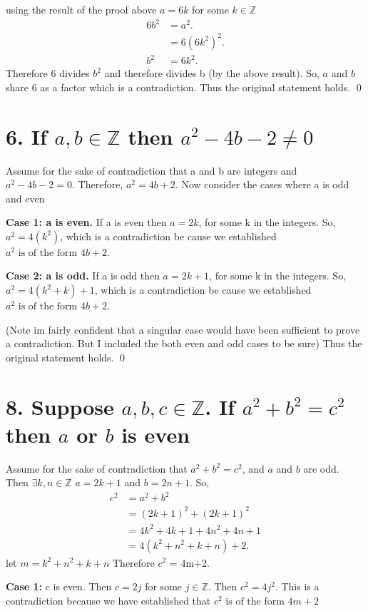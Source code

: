 \documentclass{article}
\newcommand{\ints}{\mathbb{Z}}
\newcommand{\st}{\text{ such that }}
\begin{document}
	using the result of the proof above $a = 6k$ for some $k \in \ints$
	\begin{align*}
		6b^2 &= a^2. \\
		&= 6(6k^2)^2.\\
		b^2 &= 6k^2. 
	\end{align*}
	Therefore $6$ divides $b^2$ and therefore divides b (by the above result). So, $a$ and $b$  share 6 as a factor which is a contradiction. Thus the original statement holds. \qed
	
	\section*{6. If $a,b \in \ints$ then $a^2-4b - 2 \neq 0$}
	Assume for the sake of contradiction that a and b are integers and $a^2-4b - 2 = 0$. 
	Therefore, $a^2 = 4b + 2$. Now consider the cases where a is odd and even
	
	\textbf{Case 1: a is even.}
	If a is even then $a=2k$, for some k in the integers.
	So, $a^2= 4(k^2)$, which is a contradiction be cause we established $a^2 \text{ is of the form } 4b+2$.
	
	\textbf{Case 2: a is odd.}
	If a is odd then $a=2k+1$, for some k in the integers.
	So, $a^2= 4(k^2+k)+1$, which is a contradiction be cause we established $a^2 \text{ is of the form }  4b+2$.
	
	(Note im fairly confident that a singular case would have been sufficient to prove a contradiction. But I included the both even and odd cases to be sure)
	Thus the original statement holds. \qed
	
	
	
	\section*{8. Suppose $a,b,c \in \ints$. If $a^2+b^2=c^2$ then $a$ or $b$ is even}
	Assume for the sake of contradiction that $a^2+b^2=c^2$, and $a$ and $b$ are odd. Then $\exists k,n\in \ints$ \st $a=2k+1$ and $b = 2n+1$. 	So,
	\begin{align*}
		c^2 &= a^2 + b^2\\
		&= (2k+1)^2 + (2k+1)^2\\
		&= 4k^2 + 4k + 1 + 4n^2 + 4n + 1 \\
		&= 4(k^2+n^2 + k + n) + 2.
	\end{align*}
	let $m= k^2+n^2 + k + n$ Therefore $c^2$ = 4m+2.
	
	\textbf{Case 1:} c is even.
	Then $c= 2j$ for some $j \in \ints$. Then $c^2 = 4j^2$.
	This is a contradiction because we have established that $c^2 \text{ is of the form } 4m + 2$
	
\end{document}
